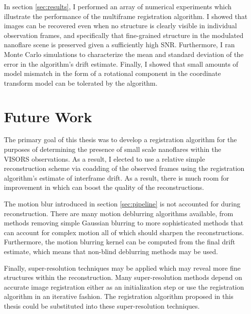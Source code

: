 \documentclass[tocnosub,noragright,centerchapter,12pt]{uiucecethesis09}
\begin{document}
In section \ref{sec:results}, I performed an array of numerical experiments which illustrate the performance of the multiframe registration algorithm.  I showed that images can be recovered even when no structure is clearly visible in individual observation frames, and specifically that fine-grained structure in the modulated nanoflare scene is preserved given a sufficiently high SNR.  Furthermore, I ran Monte Carlo simulations to characterize the mean and standard deviation of the error in the algorithm's drift estimate.  Finally, I showed that small amounts of model mismatch in the form of a rotational component in the coordinate transform model can be tolerated by the algorithm.

\section{Future Work}

The primary goal of this thesis was to develop a registration algorithm for the purposes of determining the presence of small scale nanoflares within the VISORS observations.  As a result, I elected to use a relative simple reconstruction scheme via coadding of the observed frames using the registration algorithm's estimate of interframe drift.  As a result, there is much room for improvement in which can boost the quality of the reconstructions.

The motion blur introduced in section \ref{sec:pipeline} is not accounted for during reconstruction.  There are many motion deblurring algorithms available, from methods removing simple Gaussian blurring to more sophisticated methods that can account for complex motion all of which should sharpen the reconstructions.  Furthermore, the motion blurring kernel can be computed from the final drift estimate, which means that non-blind deblurring methods may be used.

Finally, super-resolution techniques may be applied which may reveal more fine structures within the reconstruction.  Many super-resolution methods depend on accurate image registration either as an initialization step or use the registration algorithm in an iterative fashion.  The registration algorithm proposed in this thesis could be substituted into these super-resolution techniques.


%
\appendix
%

\backmatter

%


\end{document}
